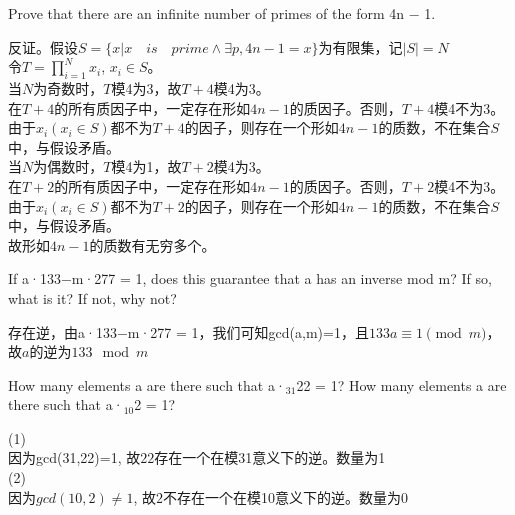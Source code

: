 \documentclass[a4paper, justified]{tufte-handout}
\begin{document}
\begin{problem}[TJ 2-30]
Prove that there are an infinite number of primes of the form 4n − 1.
\end{problem}

\begin{solution}
反证。假设$S=\{x | x \quad is \quad prime  \land \exists p, 4n-1 = x\}$为有限集，记$|S|=N$\\
令$T=\prod \limits_{i=1}^{N}x_i$, $x_i\in S$。\\
当$N$为奇数时，$T$模4为3，故$T+4$模4为3。\\
在$T+4$的所有质因子中，一定存在形如$4n-1$的质因子。否则，$T+4$模4不为3。\\
由于$x_i(x_i\in S)$都不为$T+4$的因子，则存在一个形如$4n-1$的质数，不在集合$S$中，与假设矛盾。\\
当$N$为偶数时，$T$模4为1，故$T+2$模4为3。\\
在$T+2$的所有质因子中，一定存在形如$4n-1$的质因子。否则，$T+2$模4不为3。\\
由于$x_i(x_i\in S)$都不为$T+2$的因子，则存在一个形如$4n-1$的质数，不在集合$S$中，与假设矛盾。\\
故形如$4n-1$的质数有无穷多个。
\end{solution}

\begin{problem}[CS 2.2-2]
If a·133−m·277 = 1, does this guarantee that a has an inverse mod m? If so, what
is it? If not, why not?
\end{problem}

\begin{solution}
存在逆，由a·133−m·277 = 1，我们可知gcd(a,m)=1，且$133a\equiv  1 \pmod m$，故$a$的逆为$133\mod m$
\end{solution}

\begin{problem}[CS 2.2-4]
How many elements a are there such that a·$_{31}$22 = 1? How many elements a are
there such that a·$_{10}$2 = 1?
\end{problem}

\begin{solution}
(1)\\
因为gcd(31,22)=1, 故$22$存在一个在模31意义下的逆。数量为1\\
(2)\\
因为$gcd(10,2)\neq1$, 故$2$不存在一个在模10意义下的逆。数量为0\\
\end{solution}
\end{document}
